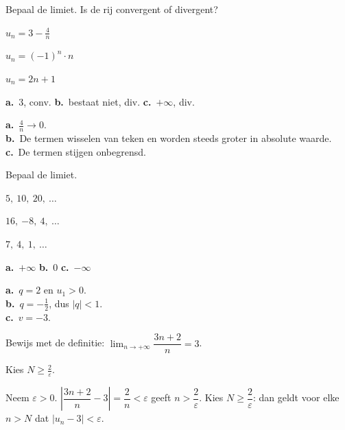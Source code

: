 \begin{oefeningen}
\begin{oefening}[1]\label{oef:h4-t1}
Bepaal de limiet. Is de rij convergent of divergent?
\begin{reeks}
  \item $u_n = 3 - \tfrac4n$
  \item $u_n = (-1)^n \cdot n$
  \item $u_n = 2n + 1$
\end{reeks}
\begin{solution}
\textbf{a.}~3, conv. \quad \textbf{b.}~bestaat niet, div. \quad \textbf{c.}~$+\infty$, div.
\end{solution}
\begin{fullsolution}
\textbf{a.}~$\tfrac4n\to 0$.\\
\textbf{b.}~De termen wisselen van teken en worden steeds groter in absolute waarde.\\
\textbf{c.}~De termen stijgen onbegrensd.
\end{fullsolution}
\end{oefening}

\begin{oefening}[1]\label{oef:h4-t2}
Bepaal de limiet.
\begin{reeks}
  \item $5,\ 10,\ 20,\ \ldots$
  \item $16,\ {-8},\ 4,\ \ldots$
  \item $7,\ 4,\ 1,\ \ldots$
\end{reeks}
\begin{solution}
\textbf{a.}~$+\infty$ \quad \textbf{b.}~0 \quad \textbf{c.}~$-\infty$
\end{solution}
\begin{fullsolution}
\textbf{a.}~$q=2$ en $u_1>0$.\\
\textbf{b.}~$q=-\tfrac12$, dus $|q|<1$.\\
\textbf{c.}~$v=-3$.
\end{fullsolution}
\end{oefening}

\begin{oefening}[2]\label{oef:h4-t3}
Bewijs met de definitie: $\displaystyle\lim_{n\to+\infty} \dfrac{3n+2}{n} = 3$.
\begin{solution}
Kies $N\geqslant\tfrac{2}{\varepsilon}$.
\end{solution}
\begin{fullsolution}
Neem $\varepsilon>0$. $\left|\dfrac{3n+2}{n}-3\right|=\dfrac2n<\varepsilon$ geeft $n>\dfrac{2}{\varepsilon}$. Kies $N\geqslant\dfrac{2}{\varepsilon}$: dan geldt voor elke $n>N$ dat $|u_n-3|<\varepsilon$.
\end{fullsolution}
\end{oefening}


\end{oefeningen}
